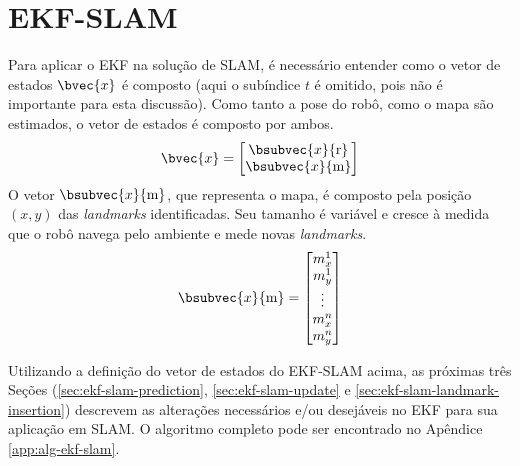 \section{EKF-SLAM}
Para aplicar o EKF na solução de SLAM, é necessário entender 
como o vetor de estados $\bvec{x}$ é composto (aqui o subíndice $t$ é omitido, pois não é importante para esta discussão). Como tanto a pose do 
robô, como o mapa são estimados, o vetor de estados é composto por ambos. 
\begin{equation}
  \bvec{x} = \begin{bmatrix}
    \bsubvec{x}{\mathrm{r}} \\
    \bsubvec{x}{\mathrm{m}}
  \end{bmatrix}
  \label{eq:slam-state-vector}
\end{equation}
O vetor $\bsubvec{x}{\mathrm{m}}$, que representa o mapa, é composto pela posição $(x, y)$ das \textit{landmarks} identificadas. 
Seu tamanho é variável e cresce à medida que o robô navega pelo ambiente e 
mede novas \textit{landmarks}.
\begin{equation}
  \bsubvec{x}{\mathrm{m}} = \begin{bmatrix}
    m_x^1\\
    m_y^1\\
    \vdots\\
    m_x^n\\
    m_y^n
  \end{bmatrix}
  \label{eq:feature-map}
\end{equation}

Utilizando a definição do vetor de estados do EKF-SLAM acima, as próximas três Seções (\ref{sec:ekf-slam-prediction}, \ref{sec:ekf-slam-update} e \ref{sec:ekf-slam-landmark-insertion}) descrevem as alterações necessários e/ou desejáveis no EKF para sua aplicação em SLAM. O algoritmo completo pode ser encontrado no Apêndice \ref{app:alg-ekf-slam}.

